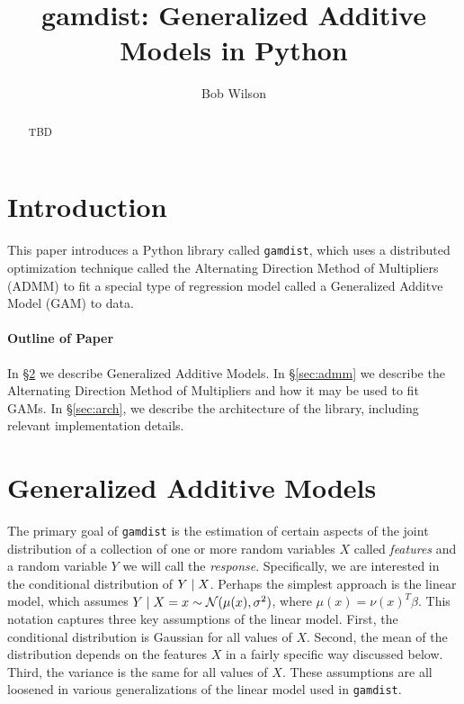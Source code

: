 \documentclass[12pt]{article}
\title{gamdist: Generalized Additive Models in Python}
\author{Bob Wilson}
\newcommand{\gamdist}{\texttt{gamdist}}
\begin{document}
\maketitle

\begin{abstract}
TBD
\end{abstract}

\newpage
\tableofcontents
\newpage

\section{Introduction}
This paper introduces a Python library called \gamdist{}, which uses a distributed optimization technique called the Alternating Direction Method of Multipliers (ADMM) to fit a special type of regression model called a Generalized Additve Model (GAM)  to data. 

\paragraph{Outline of Paper} In \S\ref{sec:gam} we describe Generalized Additive Models. In \S\ref{sec:admm} we describe the Alternating Direction Method of Multipliers and how it may be used to fit GAMs. In \S\ref{sec:arch}, we describe the architecture of the library, including relevant implementation details.

\section{Generalized Additive Models}
\label{sec:gam}

The primary goal of \gamdist{} is the estimation of certain aspects of the joint distribution of a collection of one or more random variables $X$ called \textit{features} and a random variable $Y$ we will call the \textit{response}. Specifically, we are interested in the conditional distribution of $Y \; | \; X$. Perhaps the simplest approach is the linear model, which assumes $Y \; | \; X = x \sim {\mathcal N} (\mu(x), \sigma^2)$, where $\mu(x) = \nu(x)^T \beta$. This notation captures three key assumptions of the linear model. First, the conditional distribution is Gaussian for all values of $X$. Second, the mean of the distribution depends on the features $X$ in a fairly specific way discussed below. Third, the variance is the same for all values of $X$. These assumptions are all loosened in various generalizations of the linear model used in \gamdist{}.
\end{document}
